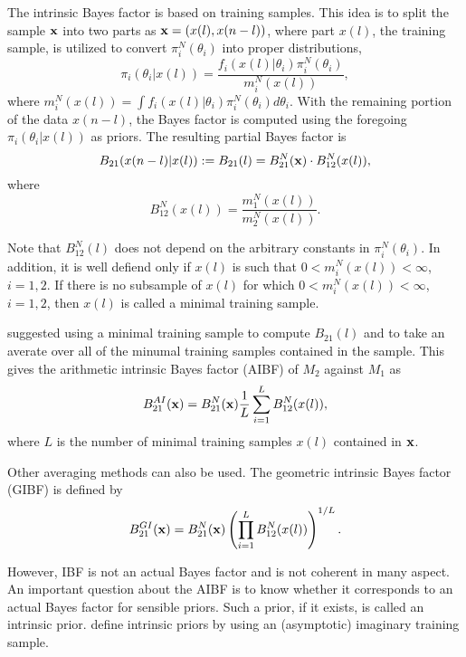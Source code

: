 \documentclass[11pt]{article}
\theoremstyle{plain}
\theoremstyle{definition}
\theoremstyle{remark}
\begin{document}
The intrinsic Bayes factor is based on training samples.
This idea is to split the sample $\mathbf{x}$ into two parts as $\mathbf{x}=(x(l),x(n-l))$, where part $x(l)$, the training sample, is utilized to convert $\pi_i^N(\theta_i)$ into proper distributions,
\begin{equation*}
    \pi_i(\theta_i | x(l)) = \frac{f_i(x(l)|\theta_i) \pi_i^N (\theta_i)}{m_i^N (x(l))},
\end{equation*}
where $m_i^N (x(l))= \int f_i (x(l)| \theta_i) \pi_i^N (\theta_i) d\theta_i$.
With the remaining portion of the data $x(n-l)$, the Bayes factor is computed using the foregoing $\pi_i(\theta_i | x(l))$ as priors.
The resulting partial Bayes factor is
\begin{equation*}
    B_{21} (x(n-l)|x(l)) := B_{21} (l) = B_{21}^N (\mathbf{x})\cdot B_{12}^N (x(l)),
\end{equation*}
where
\begin{equation*}
    B_{12}^N (x(l))= \frac{m_1^N (x(l))}{m_2^N (x(l))}.
\end{equation*}

Note that $B_{12}^N (l)$ does not depend on the arbitrary constants in $\pi_i^N (\theta_i)$.
In addition, it is well defiend only if $x(l)$ is such that $0< m_i^N (x(l))<\infty$, $i=1,2$. 
If there is no subsample of $x(l)$ for which $0<m_i^N (x(l)) < \infty$, $i=1,2$, then $x(l)$ is called a minimal training sample.

\cite{intrisicBayesFactor} suggested using a minimal training sample to compute $B_{21}(l)$ and to take an averate over all of the minumal training samples contained in the sample.
This gives the arithmetic intrinsic Bayes factor (AIBF) of $M_2$ against $M_1$ as
\begin{equation*}
    B_{21}^{AI} (\mathbf{x}) = B_{21}^N (\mathbf{x}) \frac 1 L \sum_{i=1}^L B_{12}^N (x(l)), 
\end{equation*}
where $L$ is the number of minimal training samples $x(l)$ contained in $\mathbf{x}$.

Other averaging methods can also be used.
The geometric intrinsic Bayes factor (GIBF) is defined by
\begin{equation*}
    B_{21}^{GI} (\mathbf{x}) = B_{21}^N (\mathbf{x}) \left( \prod_{i=1}^L B_{12}^N (x(l)) \right)^{1/L}.
\end{equation*}


However, IBF is not an actual Bayes factor and is not coherent in many aspect.
An important question about the AIBF is to know whether it corresponds to an actual Bayes factor for sensible priors.
Such a prior, if it exists, is called an intrinsic prior.
\cite{intrisicBayesFactor} define intrinsic priors by using an (asymptotic) imaginary training sample.
\end{document}
